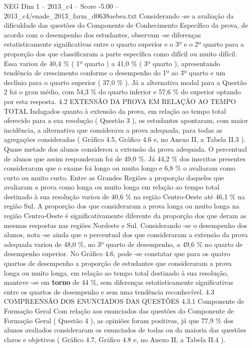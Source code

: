 \begin{textsample}{NEG Dim 1 – 2013\_c4 – Score -5.00 – 2013\_c4/enade\_2013\_farm\_d0638aebea.txt}
Considerando -se a avaliação da dificuldade das questões do Componente de Conhecimento Específico da prova, de acordo com o desempenho dos estudantes, observam -se diferenças estatisticamente significativas entre o quarto superior e o 3º e o 2º quarto para a proporção dos que classificaram a parte específica como difícil ou muito difícil.
Essa variou de 40,4 \% ( 1º quarto ) a 41,0 \% ( 3º quarto ), apresentando tendência de crescimento conforme o desempenho do 1º ao 3º quarto e um declínio para o quarto superior ( 37,0 \% ).
Já a alternativa modal para a Questão 2 foi o grau médio, com 54,3 \% do quarto inferior e 57,6 \% do superior optando por esta resposta. 4.2 EXTENSÃO DA PROVA EM RELAÇÃO AO TEMPO TOTAL Indagados quanto à extensão da prova, em relação ao tempo total oferecido para a sua resolução ( Questão 3 ), os estudantes apontaram, com maior incidência, a alternativa que considerava a prova adequada, para todas as agregações consideradas ( Gráfico 4.5, Gráfico 4.6 e, no Anexo II, a Tabela II.3 ).
Quase metade dos alunos considerou a extensão da prova adequada.
O percentual de alunos que assim responderam foi de 49,0 \%.
Já 44,2 \% dos inscritos presentes consideraram que o exame foi longo ou muito longo e 6,8 \% o avaliaram como curto ou muito curto.
Entre as Grandes Regiões a proporção daqueles que avaliaram a prova como longa ou muito longa em relação ao tempo total destinado à sua resolução variou de 40,6 \% na região Centro-Oeste até 46,1 \% na região Sul.
A proporção dos que consideraram a prova longa ou muito longa na região Centro-Oeste é significativamente diferente da proporção dos que deram as mesmas respostas nas regiões Nordeste e Sul.
Considerando -se o desempenho dos alunos, nota -se ainda que o percentual dos que consideraram a extensão da prova adequada variou de 48,0 \%, no 3º quarto de desempenho, a 49,6 \% no quarto de desempenho superior.
No Gráfico 4.6, pode -se constatar que para os quatro quartos de desempenho a proporção de estudantes que consideraram a prova longa ou muito longa, em relação ao tempo total destinado à sua resolução, manteve -se em \textbf{torno} de 44 \%, sem diferenças estatisticamente significativas entre os quartos de desempenho e sem uma tendência reconhecível. 4.3 COMPREENSÃO DOS ENUNCIADOS DAS QUESTÕES 4.3.1 Componente de Formação Geral Com relação aos enunciados das questões do Componente de Formação Geral ( Questão 4 ), as opiniões foram positivas, já que 77,9 \% dos alunos avaliados consideraram os enunciados de todas ou da maioria das questões claros e objetivos ( Gráfico 4.7, Gráfico 4.8 e, no Anexo II, a Tabela II.4 ).

\end{textsample}
